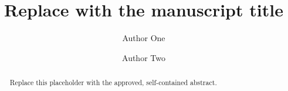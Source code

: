 \documentclass[11pt]{article}
\title{Replace with the manuscript title}
\author{Author One \and Author Two}
\date{}
\begin{document}
\maketitle

\begin{abstract}
Replace this placeholder with the approved, self-contained abstract.
\end{abstract}








\end{document}
